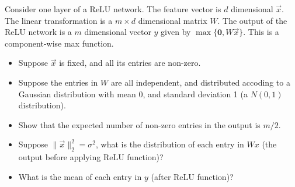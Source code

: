 \documentclass[11pt]{article}
\newenvironment{problem}[2][Problem]{\begin{trivlist}
\item[\hskip \labelsep {\bfseries #1}\hskip \labelsep {\bfseries #2.}]}{\end{trivlist}}
\begin{document}
\begin{problem}{1. (15 points)}
Consider one layer of a ReLU network. The feature vector is $d$ dimensional $\overrightarrow x$. The linear transformation is a $m\times d$ dimensional matrix $W$. The output of the ReLU network is a $m$ dimensional vector $y$ given by $\max\{\mathbf{0}, W\overrightarrow x\}$. This is a component-wise max function. 
\begin{itemize}
	\item Suppose $\overrightarrow x$ is fixed, and all its entries are non-zero.
	\item Suppose the entries in $W$ are all independent, and distributed accoding to a Gaussian distribution with mean 0, and standard deviation 1 (a $N(0,1)$ distribution).
\end{itemize} 
\begin{itemize}
	\item [1.] Show that the expected number of non-zero entries in the output is $m/2$.  
	\item [2.] Suppose $\|\overrightarrow x\|_2^2 = \sigma^2$, what is the distribution of each entry in $Wx$ (the output before applying ReLU function)?
	\item [3.] What is the mean of each entry in $y$ (after ReLU function)?
\end{itemize}

\end{problem}
%
%	
\end{document}
